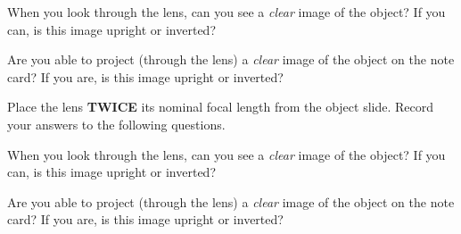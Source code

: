 \noindent
When you look through the lens, can you see a {\it clear} image of the object?
If you can, is this image upright or inverted?
\vspace*{1.5cm}

\noindent
Are you able to project (through the lens) a {\it clear} image of the object
on the note card? If you are, is this image upright or inverted?
\vspace*{1.5cm}

\noindent
Place the lens {\bf TWICE} its nominal focal length from the object slide. 
Record your answers to the following questions.
\vspace*{.5cm}

\noindent
When you look through the lens, can you see a {\it clear} image of the object?
If you can, is this image upright or inverted?
\vspace*{1.5cm}

\noindent
Are you able to project (through the lens) a {\it clear} image of the object
on the note card? If you are, is this image upright or inverted?


